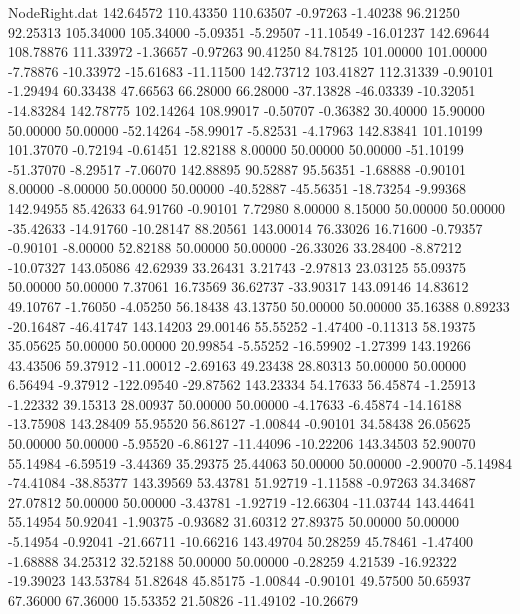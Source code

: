 \begin{filecontents}{NodeRight.dat}
 142.64572  110.43350  110.63507    -0.97263   -1.40238   96.21250   92.25313  105.34000  105.34000   -5.09351   -5.29507  -11.10549  -16.01237
 142.69644  108.78876  111.33972    -1.36657   -0.97263   90.41250   84.78125  101.00000  101.00000   -7.78876  -10.33972  -15.61683  -11.11500
 142.73712  103.41827  112.31339    -0.90101   -1.29494   60.33438   47.66563   66.28000   66.28000  -37.13828  -46.03339  -10.32051  -14.83284
 142.78775  102.14264  108.99017    -0.50707   -0.36382   30.40000   15.90000   50.00000   50.00000  -52.14264  -58.99017   -5.82531   -4.17963
 142.83841  101.10199  101.37070    -0.72194   -0.61451   12.82188    8.00000   50.00000   50.00000  -51.10199  -51.37070   -8.29517   -7.06070
 142.88895   90.52887   95.56351    -1.68888   -0.90101    8.00000   -8.00000   50.00000   50.00000  -40.52887  -45.56351  -18.73254   -9.99368
 142.94955   85.42633   64.91760    -0.90101    7.72980    8.00000    8.15000   50.00000   50.00000  -35.42633  -14.91760  -10.28147   88.20561
 143.00014   76.33026   16.71600    -0.79357   -0.90101   -8.00000   52.82188   50.00000   50.00000  -26.33026   33.28400   -8.87212  -10.07327
 143.05086   42.62939   33.26431     3.21743   -2.97813   23.03125   55.09375   50.00000   50.00000    7.37061   16.73569   36.62737  -33.90317
 143.09146   14.83612   49.10767    -1.76050   -4.05250   56.18438   43.13750   50.00000   50.00000   35.16388    0.89233  -20.16487  -46.41747
 143.14203   29.00146   55.55252    -1.47400   -0.11313   58.19375   35.05625   50.00000   50.00000   20.99854   -5.55252  -16.59902   -1.27399
 143.19266   43.43506   59.37912   -11.00012   -2.69163   49.23438   28.80313   50.00000   50.00000    6.56494   -9.37912 -122.09540  -29.87562
 143.23334   54.17633   56.45874    -1.25913   -1.22332   39.15313   28.00937   50.00000   50.00000   -4.17633   -6.45874  -14.16188  -13.75908
 143.28409   55.95520   56.86127    -1.00844   -0.90101   34.58438   26.05625   50.00000   50.00000   -5.95520   -6.86127  -11.44096  -10.22206
 143.34503   52.90070   55.14984    -6.59519   -3.44369   35.29375   25.44063   50.00000   50.00000   -2.90070   -5.14984  -74.41084  -38.85377
 143.39569   53.43781   51.92719    -1.11588   -0.97263   34.34687   27.07812   50.00000   50.00000   -3.43781   -1.92719  -12.66304  -11.03744
 143.44641   55.14954   50.92041    -1.90375   -0.93682   31.60312   27.89375   50.00000   50.00000   -5.14954   -0.92041  -21.66711  -10.66216
 143.49704   50.28259   45.78461    -1.47400   -1.68888   34.25312   32.52188   50.00000   50.00000   -0.28259    4.21539  -16.92322  -19.39023
 143.53784   51.82648   45.85175    -1.00844   -0.90101   49.57500   50.65937   67.36000   67.36000   15.53352   21.50826  -11.49102  -10.26679

\end{filecontents}
